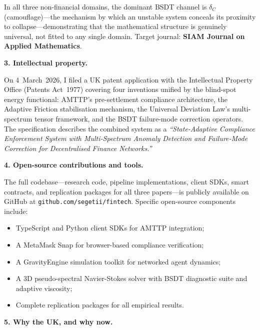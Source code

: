 \documentclass[12pt,a4paper]{article}
\begin{document}
\noindent
In all three non-financial domains, the dominant BSDT channel is
$\delta_C$ (camouflage)---the mechanism by which an unstable system
conceals its proximity to collapse---demonstrating that the mathematical
structure is genuinely universal, not fitted to any single domain.
Target journal: \textbf{SIAM Journal on Applied Mathematics}.


\textbf{3. Intellectual property.}

On 4~March~2026, I filed a UK patent application with the Intellectual
Property Office (Patents Act~1977) covering four inventions unified by
the blind-spot energy functional: AMTTP's pre-settlement compliance
architecture, the Adaptive Friction stabilisation mechanism, the
Universal Deviation Law's multi-spectrum tensor framework, and the BSDT
failure-mode correction operators.  The specification describes the
combined system as a \textit{``State-Adaptive Compliance Enforcement
System with Multi-Spectrum Anomaly Detection and Failure-Mode Correction
for Decentralised Finance Networks.''}


\textbf{4. Open-source contributions and tools.}

The full codebase---research code, pipeline implementations, client SDKs,
smart contracts, and replication packages for all three papers---is
publicly available on GitHub at
\texttt{github.com/segetii/fintech}.  Specific open-source components
include:

\begin{itemize}[nosep, leftmargin=2em]
  \item TypeScript and Python client SDKs for AMTTP integration;
  \item A MetaMask Snap for browser-based compliance verification;
  \item A GravityEngine simulation toolkit for networked agent dynamics;
  \item A 3D pseudo-spectral Navier-Stokes solver with BSDT diagnostic
        suite and adaptive viscosity;
  \item Complete replication packages for all empirical results.
\end{itemize}


\textbf{5. Why the UK, and why now.}
\end{document}
